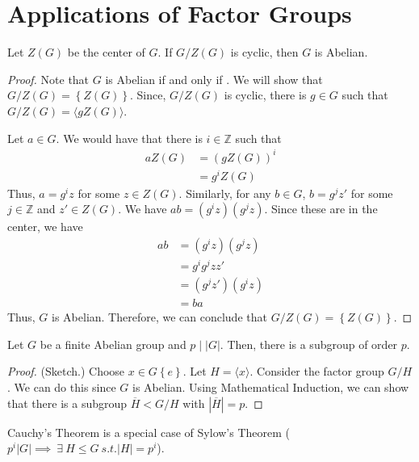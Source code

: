 \section{Applications of Factor Groups}

\begin{theorem}
    Let \(Z(G)\) be the center of \(G\). If \(G / Z(G)\) is cyclic, then \(G\) is Abelian.
\end{theorem}

\begin{proof}
    Note that \(G\) is Abelian if and only if . We will show that \(G / Z(G) = \left\{Z(G)\right\}\). Since, \(G / Z(G)\) is cyclic, there is \(g \in G\) such that \(G / Z(G) = \langle gZ(G) \rangle\).

    Let \(a \in G\). We would have that there is \(i \in \mathbb{Z}\) such that
\[
\begin{aligned}
    aZ(G) &= (gZ(G))^i \\
          &= g^iZ(G)
\end{aligned}
\]
Thus, \(a = g^iz\) for some \(z \in Z(G)\). Similarly, for any \(b \in G\), \(b = g^jz'\) for some \(j \in \mathbb{Z}\) and \(z' \in Z(G)\). We have \(ab = (g^iz)(g^jz)\). Since these are in the center, we have
\[
\begin{aligned}
    ab &= (g^iz)(g^jz) \\
       &= g^ig^jzz' \\
       &= (g^jz')(g^iz) \\
       &= ba
\end{aligned}
\]
Thus, \(G\) is Abelian. Therefore, we can conclude that \(G/Z(G) = \left\{Z(G)\right\}\).
\end{proof}

\begin{theorem}
     Let \(G\) be a finite Abelian group and \(p \mid |G|\). Then, there is a subgroup of order \(p\).
\end{theorem}

\begin{proof}
    (Sketch.) Choose \(x \in G \left\{e\right\}\). Let \(H = \langle x \rangle\). Consider the factor group \(G/H\). We can do this since \(G\) is Abelian. Using Mathematical Induction, we can show that there is a subgroup \(\overline{H} < G/H\) with \(|\overline{H}| = p\).
\end{proof}

\begin{remark}
    Cauchy's Theorem is a special case of Sylow's Theorem (\(p^i|G| \implies \ \exists \  H \leq G\ s.t. |H| = p^i\)). 
\end{remark}

